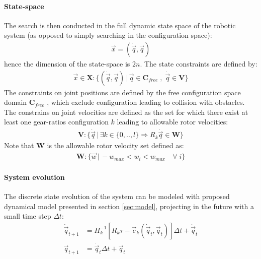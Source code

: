 \paragraph{State-space}
%
The search is then conducted in the full dynamic state space of the robotic system (as opposed to simply searching in the configuration space):
%
\begin{align}
\vec{x} = \left( \dot{\vec{q}} , \vec{q} \right)
\end{align}
%
hence the dimension of the state-space is $2n$. The state constraints are defined by:
%
\begin{align}
\vec{x} \in \boldsymbol{X}: \big\{ \left( \dot{\vec{q}} , \vec{q} \right) \,|\,  \vec{q} \in \boldsymbol{C}_{free} \;,\; \dot{\vec{q}} \in \boldsymbol{V} \big\}
\end{align}
%
The constraints on joint positions are defined by the free configuration space domain $\boldsymbol{C}_{free}$ \cite{lozano-perez_algorithm_1979}, which exclude configuration leading to collision with obstacles. The constrains on joint velocities are defined as the set for which there exist at least one gear-ratios configuration $k$ leading to allowable rotor velocities:
%
\begin{align}
\boldsymbol{V} : \big\{ \dot{\vec{q}} \,|\, \exists k \in \{0,..,l\} \Rightarrow R_k \dot{\vec{q}} \in \boldsymbol{W} \big\}
\end{align}
%
Note that $\boldsymbol{W}$ is the allowable rotor velocity set defined as:
%
\begin{align}
\boldsymbol{W} : \big\{ \vec{w} \,|\,  -w_{max} < w_i < w_{max}  \quad \forall \; i \big\}
\end{align}
%

\paragraph{System evolution}
%
The discrete state evolution of the system can be modeled with proposed dynamical model presented in section \ref{sec:model}, projecting in the future with a small time step $\Delta t$:
%
\begin{align}
\dot{\vec{q}}_{t+1} &= H_k^{-1} \left[ R_k \tau - \vec{c}_k( \dot{\vec{q}}_t , \vec{q}_t ) \right] \Delta t + \dot{\vec{q}}_{t} \\
      \vec{q}_{t+1} &=  \dot{\vec{q}}_{t} \Delta t + \vec{q}_{t}
\end{align}
%
 
